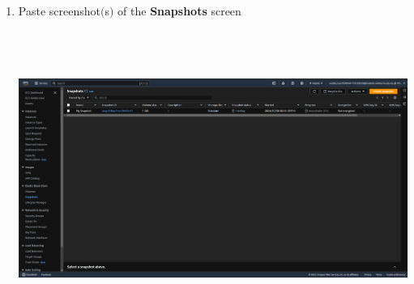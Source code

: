\documentclass[11pt]{article}
\begin{document}
\begin{enumerate}[resume]
    \newpage

    \item Paste screenshot$($s$)$ of the \textbf{Snapshots} screen\\
    
    \vspace{5mm}

    {\centering
    \includegraphics[width=6.1in, height=3.8in]{pics/9.png}
    }

\end{enumerate}
\end{document}
